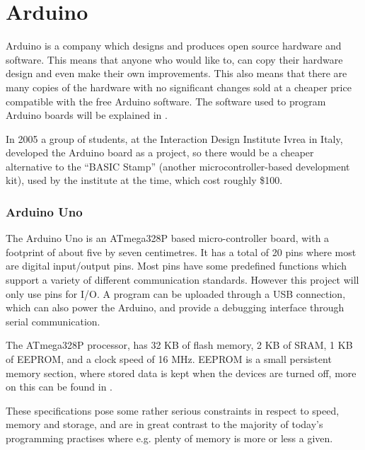 
\section{Arduino}\label{sec:arduino}
Arduino is a company which designs and produces open source hardware and software.
This means that anyone who would like to, can copy their hardware design and even make their own improvements.
This also means that there are many copies of the hardware with no significant changes sold at a cheaper price compatible with the free Arduino software.
The software used to program Arduino boards will be explained in .

\begin{tcolorbox}[floatplacement=b,float,colback=white!5,colframe=aaublue!50,title=The Birth of the Arduino \cite{birthofarduino}.]
In 2005 a group of students, at the Interaction Design Institute Ivrea in Italy, developed the Arduino board as a project, so there would be a cheaper alternative to the ``BASIC Stamp'' (another microcontroller-based development kit), used by the institute at the time, which cost roughly \$100.
\end{tcolorbox}

\subsubsection{Arduino Uno}
The Arduino Uno is an ATmega328P based micro-controller board, with a footprint of about five by seven centimetres.
It has a total of 20 pins where most are digital input/output pins.
Most pins have some predefined functions which support a variety of different communication standards. 
However this project will only use pins for I/O.
A program can be uploaded through a USB connection, which can also power the Arduino, and provide a debugging interface through serial communication.

The ATmega328P processor, has 32 KB of flash memory, 2 KB of SRAM, 1 KB of EEPROM, and a clock speed of 16 MHz.
EEPROM is a small persistent memory section, where stored data is kept when the devices are turned off, more on this can be found in \cite{EEPROM}.

These specifications pose some rather serious constraints in respect to speed, memory and storage, and are in great contrast to the majority of today's programming practises where e.g. plenty of memory is more or less a given.